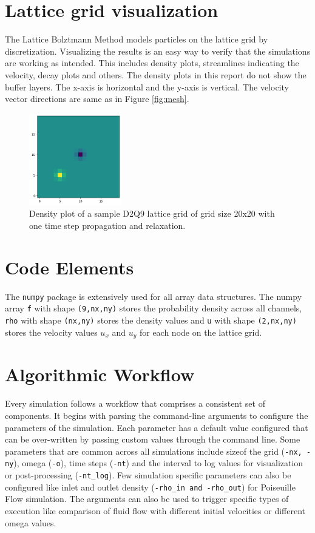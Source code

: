 \documentclass[a4paper,11pt]{report}
\begin{document}
\section{Lattice grid visualization}
The Lattice Bolztmann Method models particles on the lattice grid by discretization. Visualizing the results is an easy way to verify that the simulations are working as intended. This includes density plots, streamlines indicating the velocity, decay plots and others. The density plots in this report do not show the buffer layers. The x-axis is horizontal and the y-axis is vertical. The velocity vector directions are same as in Figure \ref{fig:mesh}.

\begin{figure}[h]
  \begin{center}
   \includegraphics[height=4cm]{images/sample_lattice.png}
   \caption{Density plot of a sample D2Q9 lattice grid of grid size 20x20 with one time step propagation and relaxation.}
  \label{fig:sample_lattice}
  \end{center}
\end{figure} 

\section{Code Elements}
The \texttt{numpy} package is extensively used for all array data structures. The numpy array \texttt{f} with shape \texttt{(9,nx,ny)} stores the  probability density across all channels, \texttt{rho} with shape \texttt{(nx,ny)} stores the density values and \texttt{u} with shape \texttt{(2,nx,ny)} stores the velocity values $u_x$ and $u_y$ for each node on the lattice grid.

\section{Algorithmic Workflow} 
Every simulation follows a workflow that comprises a consistent set of components. 
It begins with parsing the command-line arguments to configure the parameters of the simulation. 
Each parameter has a default value configured that can be over-written by passing custom values through the command line. 
Some parameters that are common across all simulations include sizeof the grid (\texttt{-nx, -ny}), omega (\texttt{-o}), time steps (\texttt{-nt}) and the interval to log values for visualization or post-processing (\texttt{-nt\_log}). 
Few simulation specific parameters can also be configured like inlet and outlet density (\texttt{-rho\_in and -rho\_out}) for Poiseuille Flow simulation. The arguments can also be used to trigger specific types of execution like comparison of fluid flow with different initial velocities or different omega values.
\end{document}
